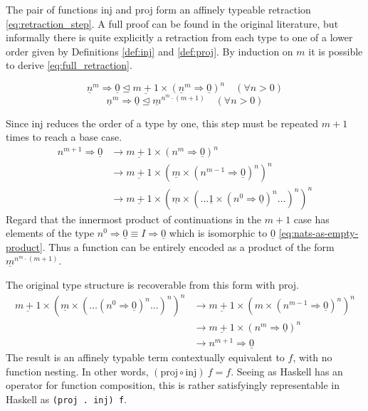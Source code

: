 \documentclass[12pt,a4paper]{report}
\theoremstyle{definition}
\theoremstyle{definition}
\theoremstyle{remark}
\begin{document}
The pair of functions inj and proj form an affinely typeable retraction \eqref{eq:retraction_step}. A full proof can be found in the original literature, but informally there is quite explicitly a retraction from each type to one of a lower order given by Definitions \eqref{def:inj} and \eqref{def:proj}. By induction on $m$ it is possible to derive \eqref{eq:full_retraction}.

\begin{equation}\label{eq:retraction_step}
    \underline{n}^m \Rightarrow \underline{0} \trianglelefteq \underline{m + 1} \times (\underline{n}^m \Rightarrow \underline {0})^n \quad (\forall n > 0)
\end{equation}
\begin{equation}\label{eq:full_retraction}
    \underline{n}^m \Rightarrow \underline{0} \trianglelefteq \underline{m}^{n^m \cdot (m + 1)} \quad (\forall n > 0)
\end{equation}

Since inj reduces the order of a type by one, this step must be repeated $m+1$ times to reach a base case.
\begin{align}
    n^{m+1} \Rightarrow \underline{0} &\rightarrow \underline{m+1} \times (n^m \Rightarrow \underline{0})^n \tag*{(Once)}\\
    &\rightarrow \underline{m+1} \times (\underline{m} \times (n^{m-1} \Rightarrow \underline{0})^n)^n \tag*{(Twice)}\\
    &\rightarrow \underline{m+1} \times (\underline{m} \times (\dots \underline{1} \times(n^0 \Rightarrow \underline{0})^n\dots)^n)^n \tag*{(m+1 times)}
\end{align}
Regard that the innermost product of continuations in the $m+1$ case has elements of the type $n^0 \Rightarrow \underline{0} \equiv I \Rightarrow \underline{0}$ which is isomorphic to $\underline{0}$ \eqref{eq:nats-as-empty-product}. Thus a function can be entirely encoded as a product of the form $\underline{m}^{n^m \cdot (m + 1)}$.

The original type structure is recoverable from this form with proj.
\begin{align}
    \underline{m+1} \times (\underline{m} \times (\dots (n^0 \Rightarrow \underline{0})^n\dots)^n)^n &\rightarrow \underline{m+1} \times (m \times (n^{m-1} \Rightarrow \underline{0})^n)^n \tag*{(m-1 times)}\\
    &\rightarrow \underline{m+1} \times (n^m \Rightarrow \underline{0})^n \tag*{(m times)}\\
    &\rightarrow n^{m+1} \Rightarrow \underline{0} \tag*{(m+1 times)}
\end{align}
The result is an affinely typable term contextually equivalent to $f$, with no function nesting. In other words, $(\text{proj} \circ \text{inj})\ f = f$. Seeing as Haskell has an operator for function composition, this is rather satisfyingly representable in Haskell as \texttt{(proj . inj) f}.
\end{document}
